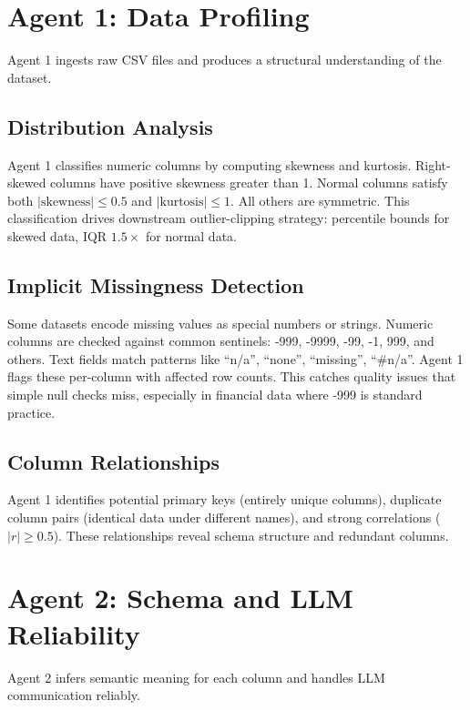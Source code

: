 \documentclass[12pt,a4paper,openany]{report}
\begin{document}
\section{Agent 1: Data Profiling}

Agent 1 ingests raw CSV files and produces a structural understanding of the dataset.

\subsection{Distribution Analysis}

Agent 1 classifies numeric columns by computing skewness and kurtosis. Right-skewed columns have positive skewness greater than 1. Normal columns satisfy both $|\text{skewness}| \leq 0.5$ and $|\text{kurtosis}| \leq 1$. All others are symmetric. This classification drives downstream outlier-clipping strategy: percentile bounds for skewed data, IQR $1.5\times$ for normal data.

\subsection{Implicit Missingness Detection}

Some datasets encode missing values as special numbers or strings. Numeric columns are checked against common sentinels: -999, -9999, -99, -1, 999, and others. Text fields match patterns like ``n/a'', ``none'', ``missing'', ``#n/a''. Agent 1 flags these per-column with affected row counts. This catches quality issues that simple null checks miss, especially in financial data where -999 is standard practice.

\subsection{Column Relationships}

Agent 1 identifies potential primary keys (entirely unique columns), duplicate column pairs (identical data under different names), and strong correlations ($|r| \geq 0.5$). These relationships reveal schema structure and redundant columns.

\section{Agent 2: Schema and LLM Reliability}

Agent 2 infers semantic meaning for each column and handles LLM communication reliably.
\end{document}
